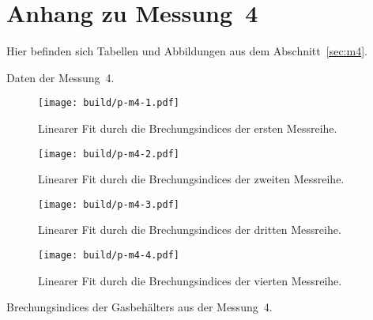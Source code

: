 \section{Anhang zu Messung~4}
\label{sec:anhang}
Hier befinden sich Tabellen und Abbildungen aus dem Abschnitt~\ref{sec:m4}.

\begin{table}
  \centering
  \caption{Daten der Messung~4.}
  \label{tab:m4-werte}
  
\end{table}

\begin{figure}
  \centering
  \texttt{[image: build/p-m4-1.pdf]}
  \caption{Linearer Fit durch die Brechungsindices der ersten Messreihe.}
  \label{fig:m4-1}
\end{figure}

\begin{figure}
  \centering
  \texttt{[image: build/p-m4-2.pdf]}
  \caption{Linearer Fit durch die Brechungsindices der zweiten Messreihe.}
  \label{fig:m4-2}
\end{figure}

\begin{figure}
  \centering
  \texttt{[image: build/p-m4-3.pdf]}
  \caption{Linearer Fit durch die Brechungsindices der dritten Messreihe.}
  \label{fig:m4-3}
\end{figure}

\begin{figure}
  \centering
  \texttt{[image: build/p-m4-4.pdf]}
  \caption{Linearer Fit durch die Brechungsindices der vierten Messreihe.}
  \label{fig:m4-4}
\end{figure}

\begin{landscape}
  \begin{table}
    \centering
    \caption{Brechungsindices der Gasbehälters aus der Messung~4.}
    \label{tab:m4-behbrech}
    
  \end{table}
\end{landscape}
